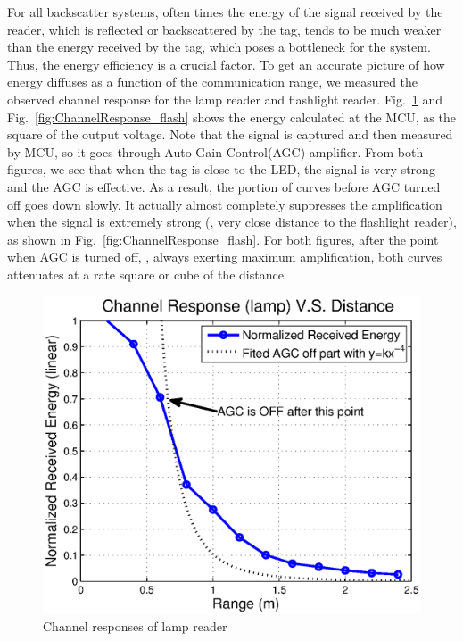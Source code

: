  For all backscatter systems, often times the energy of the signal received by the reader, which is reflected or backscattered by the tag, tends to be much weaker than the energy received by the tag, which poses a bottleneck for the system. %
%
Thus, the energy efficiency is a crucial factor. To get an accurate picture of how energy diffuses as a function of the communication range, we measured the observed channel response for the lamp reader and flashlight reader. Fig.~\ref{fig:ChannelResponse} and Fig.~\ref{fig:ChannelResponse_flash} shows the energy calculated at the MCU, as the square of the output voltage. 
Note that the signal is captured and then measured by MCU, so it goes through Auto Gain Control(AGC) amplifier. 
From both figures, we see that when the tag is close to the LED, the signal is very strong and the AGC is effective. As a result, the portion of curves before AGC turned off goes down slowly. It actually almost completely suppresses the amplification when the signal is extremely strong (\ie, very close distance to the flashlight reader), as  shown in Fig.~\ref{fig:ChannelResponse_flash}. For both figures, after the point when AGC is turned off, \ie, always exerting maximum amplification, both curves attenuates at a rate square or cube of the distance.
\begin{figure}[!ht]
\centering
\includegraphics[width=0.77\columnwidth]{fig/ChannelResopnse_lamp.eps}
\vskip -0.05in
\caption{Channel responses of lamp reader}
\label{fig:ChannelResponse}
\vskip -0.05in
\end{figure}

